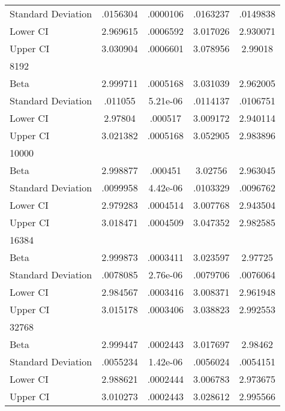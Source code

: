 {\begin{tabular}{l*{1}{cccc}}
Standard Deviation  &    .0156304&    .0000106&    .0163237&    .0149838\\
Lower CI            &    2.969615&    .0006592&    3.017026&    2.930071\\
Upper CI            &    3.030904&    .0006601&    3.078956&     2.99018\\
\hline
8192                &            &            &            &            \\
Beta                &    2.999711&    .0005168&    3.031039&    2.962005\\
Standard Deviation  &     .011055&    5.21e-06&    .0114137&    .0106751\\
Lower CI            &     2.97804&     .000517&    3.009172&    2.940114\\
Upper CI            &    3.021382&    .0005168&    3.052905&    2.983896\\
\hline
10000               &            &            &            &            \\
Beta                &    2.998877&     .000451&     3.02756&    2.963045\\
Standard Deviation  &    .0099958&    4.42e-06&    .0103329&    .0096762\\
Lower CI            &    2.979283&    .0004514&    3.007768&    2.943504\\
Upper CI            &    3.018471&    .0004509&    3.047352&    2.982585\\
\hline
16384               &            &            &            &            \\
Beta                &    2.999873&    .0003411&    3.023597&     2.97725\\
Standard Deviation  &    .0078085&    2.76e-06&    .0079706&    .0076064\\
Lower CI            &    2.984567&    .0003416&    3.008371&    2.961948\\
Upper CI            &    3.015178&    .0003406&    3.038823&    2.992553\\
\hline
32768               &            &            &            &            \\
Beta                &    2.999447&    .0002443&    3.017697&     2.98462\\
Standard Deviation  &    .0055234&    1.42e-06&    .0056024&    .0054151\\
Lower CI            &    2.988621&    .0002444&    3.006783&    2.973675\\
Upper CI            &    3.010273&    .0002443&    3.028612&    2.995566\\

\end{tabular}}

